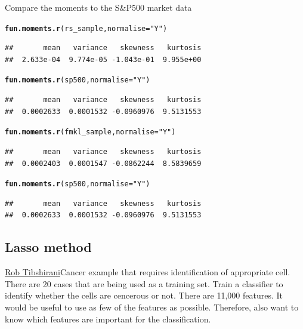 \documentclass[12pt, a4paper, oneside]{article}\usepackage[]{graphicx}\usepackage[]{color}
\makeatletter
\newcommand{\hlstr}[1]{\textcolor[rgb]{0.192,0.494,0.8}{#1}}%
\newcommand{\hlstd}[1]{\textcolor[rgb]{0.345,0.345,0.345}{#1}}%
\newcommand{\hlkwc}[1]{\textcolor[rgb]{0.333,0.667,0.333}{#1}}%
\newcommand{\hlkwd}[1]{\textcolor[rgb]{0.737,0.353,0.396}{\textbf{#1}}}%
\newenvironment{kframe}{%
 \def\at@end@of@kframe{}%
 \ifinner\ifhmode%
  \def\at@end@of@kframe{\end{minipage}}%
  \begin{minipage}{\columnwidth}%
 \fi\fi%
 \def\FrameCommand##1{\hskip\@totalleftmargin \hskip-\fboxsep
 \colorbox{shadecolor}{##1}\hskip-\fboxsep
     \hskip-\linewidth \hskip-\@totalleftmargin \hskip\columnwidth}%
 \MakeFramed {\advance\hsize-\width
   \@totalleftmargin\z@ \linewidth\hsize
   \@setminipage}}%
 {\par\unskip\endMakeFramed%
 \at@end@of@kframe}
\newenvironment{knitrout}{}{} %
\makeatother
\begin{document}
Compare the moments to the S\&P500 market data
\begin{knitrout}
\color{fgcolor}\begin{kframe}
\begin{alltt}
\hlkwd{fun.moments.r}\hlstd{(rs_sample,} \hlkwc{normalise} \hlstd{=} \hlstr{"Y"}\hlstd{)}
\end{alltt}
\begin{verbatim}
##       mean   variance   skewness   kurtosis 
##  2.633e-04  9.774e-05 -1.043e-01  9.955e+00
\end{verbatim}
\begin{alltt}
\hlkwd{fun.moments.r}\hlstd{(sp500,} \hlkwc{normalise} \hlstd{=} \hlstr{"Y"}\hlstd{)}
\end{alltt}
\begin{verbatim}
##       mean   variance   skewness   kurtosis 
##  0.0002633  0.0001532 -0.0960976  9.5131553
\end{verbatim}
\begin{alltt}
\hlkwd{fun.moments.r}\hlstd{(fmkl_sample,} \hlkwc{normalise} \hlstd{=} \hlstr{"Y"}\hlstd{)}
\end{alltt}
\begin{verbatim}
##       mean   variance   skewness   kurtosis 
##  0.0002403  0.0001547 -0.0862244  8.5839659
\end{verbatim}
\begin{alltt}
\hlkwd{fun.moments.r}\hlstd{(sp500,} \hlkwc{normalise} \hlstd{=} \hlstr{"Y"}\hlstd{)}
\end{alltt}
\begin{verbatim}
##       mean   variance   skewness   kurtosis 
##  0.0002633  0.0001532 -0.0960976  9.5131553
\end{verbatim}
\end{kframe}
\end{knitrout}

\subsection{Lasso method}
\href{http://www.mathtube.org/lecture/video/lasso-brief-review-and-new-significance-test#.U1aODV1sp94.twitter}{Rob Tibshirani}Cancer example that requires identification of appropriate cell. There are 20 cases that are being used as a training set.  Train a classifier to identify whether the cells are cencerous or not.  There are 11,000 features. It would be useful to use as few of the features as possible. Therefore, also want to know which features are important for the classification. 
\end{document}
